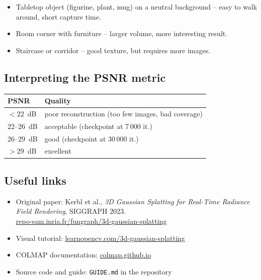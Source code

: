\documentclass{article}
\begin{document}
\begin{itemize}
    \item Tabletop object (figurine, plant, mug) on a neutral background --
          easy to walk around, short capture time.
    \item Room corner with furniture -- larger volume, more interesting result.
    \item Staircase or corridor -- good texture, but requires more images.
\end{itemize}

\subsection*{Interpreting the PSNR metric}

\begin{center}
\begin{tabular}{ll}
\toprule
PSNR & Quality \\
\midrule
$< 22$~dB & poor reconstruction (too few images, bad coverage) \\
$22$--$26$~dB & acceptable (checkpoint at 7\,000 it.) \\
$26$--$29$~dB & good (checkpoint at 30\,000 it.) \\
$> 29$~dB & excellent \\
\bottomrule
\end{tabular}
\end{center}

\subsection*{Useful links}

\begin{itemize}
    \item Original paper: Kerbl et al., \textit{3D Gaussian Splatting for
          Real-Time Radiance Field Rendering}, SIGGRAPH 2023.\\
          \href{https://repo-sam.inria.fr/fungraph/3d-gaussian-splatting/}{repo-sam.inria.fr/fungraph/3d-gaussian-splatting}
    \item Visual tutorial:
          \href{https://learnopencv.com/3d-gaussian-splatting/}{learnopencv.com/3d-gaussian-splatting}
    \item COLMAP documentation:
          \href{https://colmap.github.io/}{colmap.github.io}
    \item Source code and guide: \texttt{GUIDE.md} in the repository
\end{itemize}
\end{document}
